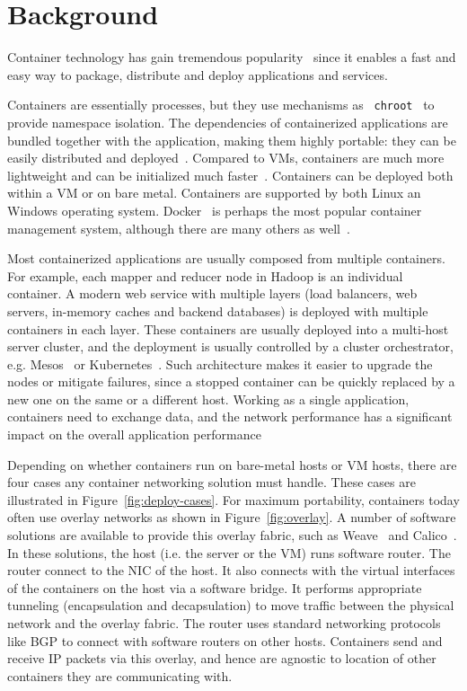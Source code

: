 \section{Background}
\label{sec:background}

Container technology has gain tremendous popularity~\cite{iron-io-300-million}
since it enables a fast and easy way to package, distribute and deploy
applications and services.  

Containers are essentially processes, but they use mechanisms as {\tt
chroot}~\cite{chroot} to provide namespace isolation.  The dependencies of
containerized applications are bundled together with the application, making
them highly portable: they can be easily distributed and deployed~\cite{docker}.
Compared to VMs, containers are much more lightweight and can be initialized
much faster~\cite{docker:linjournal}. Containers can be deployed both within a VM or
on bare metal. Containers are supported by both Linux an Windows operating
system.  Docker~\cite{docker} is perhaps the most popular container management
system, although there are many others as well~\cite{coreos,kubernetes}.

Most containerized applications are usually composed from multiple containers.
For example, each mapper and reducer node in Hadoop \cite{hadoop} is an
individual container. A modern web service with multiple layers (load balancers,
web servers, in-memory caches and backend databases) is deployed with multiple
containers in each layer.  These containers are usually deployed into a
multi-host server cluster, and the deployment is usually controlled by a cluster
orchestrator, e.g. Mesos~\cite{mesos} or Kubernetes~\cite{xxx}.  Such architecture makes it easier to
upgrade the nodes or mitigate failures, since a stopped container can be quickly
replaced by a new one on the same or a different host.  Working as a single
application, containers need to exchange data, and the network performance has a
significant impact on the overall application performance~\cite{varys,orchestra,reining,chowdhury}

Depending on whether containers run on bare-metal hosts or VM hosts, there are
four cases any container networking solution must handle. These cases are
illustrated in Figure~\ref{fig:deploy-cases}.  For maximum portability,
containers today often use overlay networks as shown in Figure~\ref{fig:overlay}.
A number of software solutions are available to provide this overlay fabric,
such as Weave~\cite{weave} and Calico~\cite{calico}. In these solutions, the
host (i.e.  the server or the VM) runs software router. The router connect to
the NIC of the host. It also connects with the virtual interfaces of the
containers on the host via a software bridge. It performs appropriate tunneling
(encapsulation and decapsulation) to move traffic between the physical network
and the overlay fabric. The router uses standard networking protocols like BGP
to connect with software routers on other hosts. Containers send and receive IP
packets via this overlay, and hence are agnostic to location of other containers
they are communicating with.


